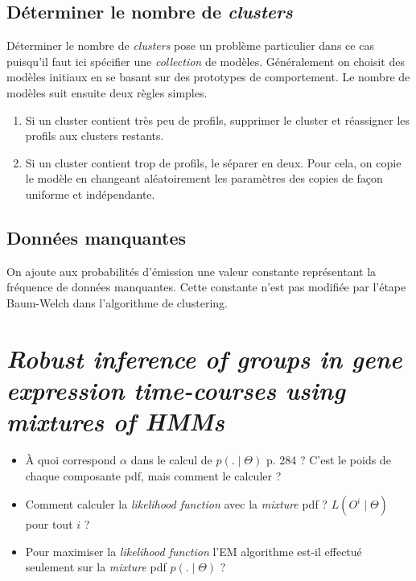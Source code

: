 \documentclass[a4paper, 11pt]{article}
\begin{document}
\subsection{Déterminer le nombre de \textit{clusters}}
Déterminer le nombre de \textit{clusters} pose un problème particulier dans ce cas puisqu'il faut ici spécifier une \textit{collection} de modèles. Généralement on choisit des modèles initiaux en se basant sur des prototypes de comportement. Le nombre de modèles suit ensuite deux règles simples.
\begin{enumerate}
	\item Si un cluster contient très peu de profils, supprimer le cluster et réassigner les profils aux clusters restants. 
	\item Si un cluster contient trop de profils, le séparer en deux. Pour cela, on copie le modèle en changeant aléatoirement les paramètres des copies de façon uniforme et indépendante. 
\end{enumerate}

\subsection{Données manquantes}
On ajoute aux probabilités d'émission une valeur constante représentant la fréquence de données manquantes. Cette constante n'est pas modifiée par l'étape Baum-Welch dans l'algorithme de clustering. 

\section{\textit{Robust inference of groups in gene expression time-courses using mixtures of HMMs}}

\begin{itemize}
	\item À quoi correspond $\alpha$ dans le calcul de $p(.\mid \Theta)$ p. 284 ? C'est le poids de chaque composante pdf, mais comment le calculer ?
	\item Comment calculer la \textit{likelihood function} avec la \textit{mixture} pdf ? $L(O^i \mid \Theta)$ pour tout $i$ ?
	\item Pour maximiser la \textit{likelihood function} l'EM algorithme est-il effectué seulement sur la \textit{mixture} pdf $p(.\mid\Theta)$ ?
\end{itemize}
\end{document}
